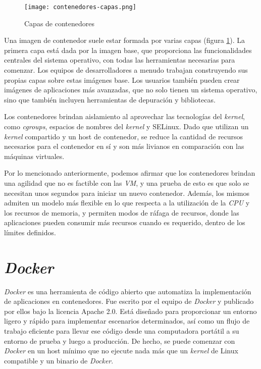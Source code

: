\begin{center}
    \begin{figure}   
       \begin{center}
          \texttt{[image: contenedores-capas.png]}
       \end{center}
       \caption{Capas de contenedores}
       \label{capasContenedores}
    \end{figure}
 \end{center}

Una imagen de contenedor suele estar formada por varias capas (figura \ref{capasContenedores}).
La primera capa está dada por la imagen base, que proporciona las funcionalidades 
centrales del sistema operativo, con todas las herramientas necesarias para comenzar. 
Los equipos de desarrolladores a menudo trabajan construyendo sus propias capas sobre 
estas imágenes base. Los usuarios también pueden crear imágenes de aplicaciones más 
avanzadas, que no solo tienen un sistema operativo, sino que también incluyen 
herramientas de depuración y bibliotecas.

Los contenedores brindan aislamiento al aprovechar las tecnologías del \emph{kernel}, como 
\emph{cgroups}, espacios de nombres del \emph{kernel} y SELinux. Dado que  
utilizan un \emph{kernel} compartido y un host de contenedor, se reduce la cantidad de 
recursos necesarios para el contenedor en sí y son más livianos en comparación 
con las máquinas virtuales. 

Por lo mencionado anteriormente, podemos afirmar que los contenedores brindan una agilidad 
que no es factible con las \emph{VM}, y una prueba de esto es que solo se 
necesitan unos segundos para iniciar un nuevo contenedor. 
Además, los mismos admiten un 
modelo más flexible en lo que respecta a la utilización de la \emph{CPU} y los recursos 
de memoria, y permiten modos de ráfaga de recursos, donde las aplicaciones 
pueden consumir más recursos cuando es requerido, dentro de los límites definidos.


\section{\emph{Docker}}

\emph{Docker} es una herramienta de código abierto que automatiza la implementación de aplicaciones 
en contenedores. Fue escrito por el equipo de \emph{Docker} y publicado por ellos bajo la 
licencia Apache 2.0. Está diseñado para proporcionar 
un entorno ligero y rápido para implementar escenarios determinados, así como un flujo de 
trabajo 
eficiente para llevar ese código desde una computadora portátil a su entorno de prueba 
y luego a producción. De hecho, se puede comenzar con \emph{Docker} en un host mínimo que 
no ejecute nada más que un \emph{kernel} de Linux compatible y un binario de \emph{Docker}.



